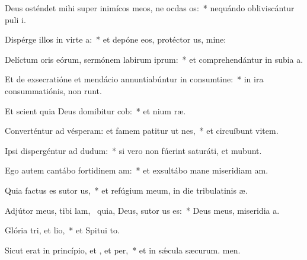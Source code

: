 \item Deus osténdet mihi super inimícos meos, ne ocdas os:~* nequándo obliviscántur puli i.
\item Dispérge illos in virte a:~* et depóne eos, protéctor us, mine:
\item Delíctum oris eórum, sermónem labirum iprum:~* et comprehendántur in subia a.
\item Et de exsecratióne et mendácio annuntiabúntur in consumtine:~* in ira consummatiónis,  non runt.
\item Et scient quia Deus domibitur cob:~* et nium ræ.
\item Converténtur ad vésperam: et famem patitur ut nes,~* et circuíbunt vitem.
\item Ipsi dispergéntur ad dudum:~* si vero non fúerint saturáti, et mubunt.
\item Ego autem cantábo fortidinem am:~* et exsultábo mane miseridiam am.
\item Quia factus es sutor us,~* et refúgium meum, in die tribulatinis æ.
\item Adjútor meus, tibi lam,~\pscross{} quia, Deus, sutor us es:~* Deus meus, miseridia a.
\item Glória tri, et lio,~* et Spitui to.
\item Sicut erat in princípio, et , et per,~* et in sǽcula sæcurum. men.
